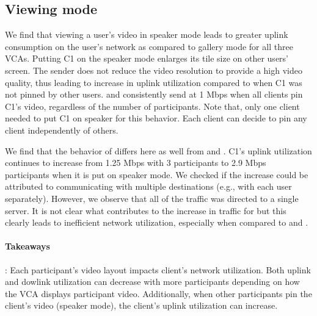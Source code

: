 \subsection{Viewing mode}
We find that viewing a user's video in speaker mode leads to greater uplink consumption on the user's network as compared to gallery mode for all three VCAs. Putting C1 on the speaker mode enlarges its tile size on other users' screen. The sender does not reduce the video resolution to provide a high video quality, thus leading to increase in uplink utilization compared to when C1 was not pinned by other users. \zoom and \meet consistently send at 1 Mbps when all clients pin C1's video, regardless of the number of participants. Note that, only one client needed to put C1 on speaker for this behavior. Each client can decide to pin any client independently of others.

We find that the behavior of \teams differs here as well from \meet and \zoom. C1's uplink utilization continues to increase from 1.25 Mbps with 3 participants to 2.9 Mbps participants when it is put on speaker mode. We checked if the increase could be attributed to \teams communicating with multiple destinations (e.g., with each user separately). However, we observe that all of the traffic was directed to a single server. It is not clear what contributes to the increase in traffic for \teams but this clearly leads to inefficient network utilization, especially when compared to \zoom and \meet. 

\begin{mdframed}[roundcorner=5pt, backgroundcolor=black!10]
\paragraph{Takeaways}: Each participant's video layout impacts client's network utilization. Both uplink and dowlink utilization can decrease with more participants depending on how the VCA displays participant video. Additionally, when other participants pin the client's video (speaker mode), the client's uplink utilization can increase. 
\end{mdframed}


